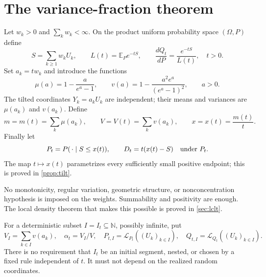 \documentclass[11pt,a4paper]{article}
\numberwithin{equation}{section}
\theoremstyle{definition}
\theoremstyle{remark}
\newcommand{\N}{\mathbb N}
\newcommand{\E}{\mathbb E}
\newcommand{\Qt}{Q_t}
\newcommand{\Pt}{P_t}
\newcommand{\Law}{\mathcal L}
\begin{document}
\section{The variance-fraction theorem}
\label{sec:main}
Let $w_k>0$ and $\sum_kw_k<\infty$. On the product uniform probability
space $(\Omega,P)$ define
\[
 S=\sum_{k\ge1}w_kU_k,\qquad
 L(t)=\E_P e^{-tS},\qquad
 \frac{d\Qt}{dP}=\frac{e^{-tS}}{L(t)},\quad t>0.
\]
Set $a_k=tw_k$ and introduce the functions
\begin{equation}\label{eq:mu-v}
 \mu(a)=1-\frac{a}{e^a-1},\qquad
 v(a)=1-\frac{a^2e^a}{(e^a-1)^2},\qquad a>0.
\end{equation}
The tilted coordinates $Y_k=a_kU_k$ are independent; their means and
variances are $\mu(a_k)$ and $v(a_k)$. Define
\begin{equation}\label{eq:mVx}
 m=m(t)=\sum_k\mu(a_k),\qquad
 V=V(t)=\sum_kv(a_k),\qquad
 x=x(t)=\frac{m(t)}t.
\end{equation}
Finally let
\begin{equation}\label{eq:conditional}
 \Pt=P(\,\cdot\mid S\le x(t)),\qquad
 D_t=t(x(t)-S)\quad\hbox{under }\Pt.
\end{equation}
The map $t\mapsto x(t)$ parametrizes every sufficiently small positive
endpoint; this is proved in \cref{prop:tilt}.

No monotonicity, regular variation, geometric structure, or
nonconcentration hypothesis is imposed on the weights. Summability
and positivity are enough. The local density theorem that makes this
possible is proved in \cref{sec:lclt}.

For a deterministic subset $I=I_t\subseteq\N$, possibly infinite, put
\[
 V_I=\sum_{k\in I}v(a_k),\quad \alpha_t=V_I/V,
 \quad P_{t,I}=\Law_{\Pt}((U_k)_{k\in I}),
 \quad Q_{t,I}=\Law_{\Qt}((U_k)_{k\in I}).
\]
There is no requirement that $I_t$ be an initial segment, nested, or
chosen by a fixed rule independent of $t$. It must not depend on the
realized random coordinates.
\end{document}
